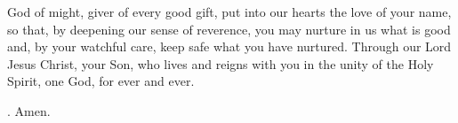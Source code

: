 \lettrine[lines=3]{G}{}od of might, giver of every good gift,
put into our hearts the love of your name,
so that, by deepening our sense of reverence,
you may nurture in us what is good
and, by your watchful care,
keep safe what you have nurtured.
Through our Lord Jesus Christ, your Son,
who lives and reigns with you in the unity of the Holy Spirit,
one God, for ever and ever. \par \Rbar. Amen.
